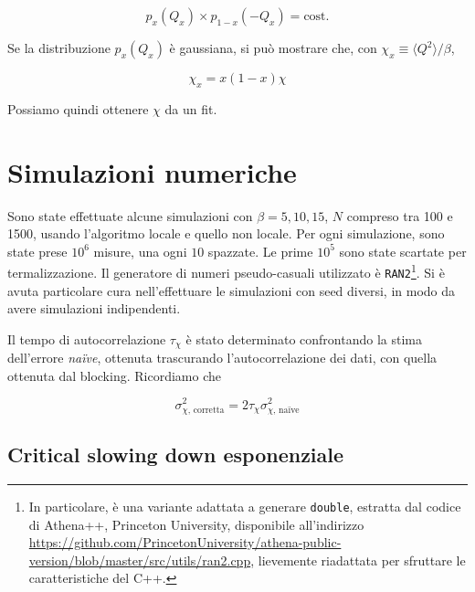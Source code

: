 \documentclass[a4paper,11pt]{article}
\newcommand{\avg}[1]{\langle {#1} \rangle}
\newcommand{\code}[1]{\texttt{#1}}
\begin{document}
    \begin{equation}
        p_x (Q_x) \times p_{1-x} (- Q_x) = \text{cost.}
    \end{equation}

    Se la distribuzione $p_x (Q_x)$ è gaussiana, si può mostrare che, con $\chi_x \equiv \avg{Q^2}/\beta$, 
    
    \begin{equation}
        \chi_x = x(1-x) \chi
    \end{equation}

    
    Possiamo quindi ottenere $\chi$ da un fit.
    
    \section{Simulazioni numeriche}
    
    Sono state effettuate alcune simulazioni con $\beta = 5, 10, 15$, $N$ compreso tra 100 e 1500, usando l'algoritmo locale e quello non locale. Per ogni simulazione, sono state prese $10^6$ misure, una ogni $10$ spazzate. Le prime $10^5$ sono state scartate per termalizzazione. Il generatore di numeri pseudo-casuali utilizzato è \code{RAN2}\footnote{In particolare, è una variante adattata a generare \code{double}, estratta dal codice di Athena++, Princeton University, disponibile all'indirizzo \url{https://github.com/PrincetonUniversity/athena-public-version/blob/master/src/utils/ran2.cpp}, lievemente riadattata per sfruttare le caratteristiche del C++.}. Si è avuta particolare cura nell'effettuare le simulazioni con seed diversi, in modo da avere simulazioni indipendenti.
    
    Il tempo di autocorrelazione $\tau_\chi$ è stato determinato confrontando la stima dell'errore \emph{naïve}, ottenuta trascurando l'autocorrelazione dei dati, con quella ottenuta dal blocking. Ricordiamo che
    
    \begin{equation}
        \sigma^2_{\chi \text{, corretta}} = 2 \tau_\chi \sigma^2_{\chi \text{, naïve}}
    \end{equation}

    
    \subsection{Critical slowing down esponenziale}
    
\end{document}
